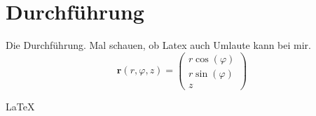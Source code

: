 \section{Durchführung}
\label{sec:Durchführung}
Die Durchführung. Mal schauen, ob Latex auch Umlaute kann bei mir.
\begin{equation}
    \symbf{r}(r,\varphi, z) = 
    \begin{pmatrix}
        r \cos(\varphi) \\ r \sin(\varphi) \\ z
    \end{pmatrix}
\end{equation}

\LaTeX


